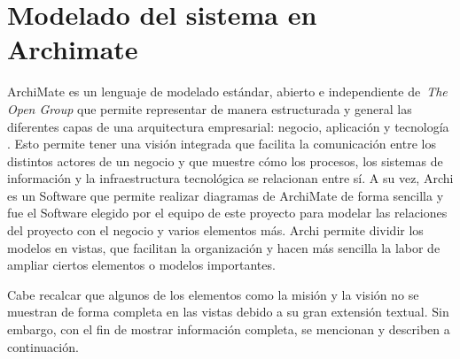 \section{Modelado del sistema en Archimate}
\noindent
ArchiMate es un lenguaje de modelado estándar, abierto e independiente de~\textit{The Open Group} que permite representar de manera estructurada y general las diferentes capas de una arquitectura empresarial: negocio, aplicación y tecnología \citep{josey2016introduction}. Esto permite tener una visión integrada que facilita la comunicación entre los distintos actores de un negocio y que muestre cómo los procesos, los sistemas de información y la infraestructura tecnológica se relacionan entre sí.
A su vez, Archi es un Software que permite realizar diagramas de ArchiMate de forma sencilla y fue el Software elegido por el equipo de este proyecto para modelar las relaciones del proyecto con el negocio y varios elementos más. Archi permite dividir los modelos en vistas, que facilitan la organización y hacen más sencilla la labor de ampliar ciertos elementos o modelos importantes.

Cabe recalcar que algunos de los elementos como la misión y la visión no se muestran de forma completa en las vistas debido a su gran extensión textual. Sin embargo, con el fin de mostrar información completa, se mencionan y describen a continuación.


